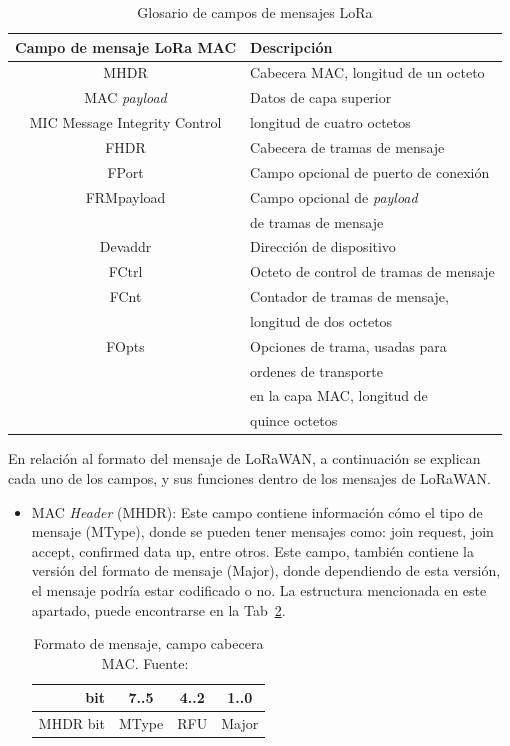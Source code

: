 \begin{justify}
\begin{table}[!ht]
\begin{tabular}{|c|l|}
\hline
Campo de mensaje LoRa MAC & Descripción \\\hline
MHDR & Cabecera	MAC, longitud de un octeto\\\hline
MAC \textit{payload}	& Datos de capa superior\\\hline
MIC	Message Integrity Control & longitud de cuatro octetos\\\hline
FHDR  &	Cabecera de tramas de mensaje\\\hline
FPort	& Campo opcional de puerto de conexión\\\hline
FRMpayload	& Campo opcional de \textit{payload} \\&de tramas de mensaje\\\hline
Devaddr	& Dirección de dispositivo\\\hline
FCtrl & Octeto de control de tramas de mensaje\\\hline
FCnt &	Contador de tramas de mensaje,\\& longitud de dos octetos\\\hline
FOpts &	Opciones de trama, usadas para \\&ordenes de transporte\\ & en la capa MAC, longitud de \\&quince octetos\\\hline
\end{tabular}
\caption{Glosario de campos de mensajes LoRa}
\label{tab:loramsg}
\end{table}
En relación al formato del mensaje de LoRaWAN, a continuación se explican cada uno de los campos, y sus funciones dentro de los mensajes de LoRaWAN.\\
\begin{itemize}
\item MAC \textit{Header} (MHDR): Este campo contiene información cómo el tipo de mensaje (MType), donde se pueden tener mensajes como: join request, join accept, confirmed data up, entre otros. Este campo, también contiene la versión del formato de mensaje (Major), donde dependiendo de esta versión, el mensaje podría estar codificado o no. La estructura mencionada en este apartado, puede encontrarse en la Tab~\ref{msg:1}.

\begin{table}[!ht]
\centering
\begin{tabular}{|r|c|c|c|}
\hline
bit & 7..5 & 4..2 & 1..0 \\\hline
MHDR bit & MType & RFU & Major\\\hline
\end{tabular}
\caption{Formato de mensaje, campo cabecera MAC. Fuente:~\cite{Sornin}}
\label{msg:1}
\end{table}


\end{itemize}
\end{justify}
